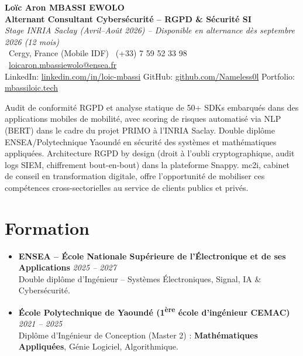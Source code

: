 \documentclass[a4paper,11pt]{article}
\begin{document}
\begin{center}
    {\Large \textbf{Lo\"ic Aron MBASSI EWOLO}} \\ \vspace{4pt}
    \textbf{\large Alternant Consultant Cybersécurité -- RGPD \& Sécurité SI} \\
    \textit{\small Stage INRIA Saclay (Avril--Ao\^ut 2026) -- Disponible en alternance d\`es septembre 2026 (12 mois)} \\ \vspace{4pt}
    \small
    \Pointinghand\ Cergy, France (Mobile IDF) \quad \Mobilefone\ (+33) 7 59 52 33 98 \quad
    {\color{primary}\Letter\ \href{mailto:loicaron.mbassiewolo@ensea.fr}{loicaron.mbassiewolo@ensea.fr}} \\ \vspace{2pt}
    {\color{primary}LinkedIn: \href{https://www.linkedin.com/in/loic-mbassi/}{linkedin.com/in/loic-mbassi}} \quad
    {\color{primary}GitHub: \href{https://github.com/Nameless0l}{github.com/Nameless0l}} \quad
    {\color{primary}Portfolio: \href{https://mbassiloic.tech}{mbassiloic.tech}}
\end{center}
\vspace{-6pt}
\noindent\small{Audit de conformité RGPD et analyse statique de 50+ SDKs embarqués dans des applications mobiles de mobilité, avec scoring de risques automatisé via NLP (BERT) dans le cadre du projet PRIMO à l'INRIA Saclay. Double diplôme ENSEA/Polytechnique Yaoundé en sécurité des systèmes et mathématiques appliquées. Architecture RGPD by design (droit à l'oubli cryptographique, audit logs SIEM, chiffrement bout-en-bout) dans la plateforme Snappy. mc2i, cabinet de conseil en transformation digitale, offre l'opportunité de mobiliser ces compétences cross-sectorielles au service de clients publics et privés.}

\section{Formation}
\begin{itemize}[leftmargin=*, label=\tiny$\bullet$, nosep]
    \item \textbf{ENSEA -- \'Ecole Nationale Sup\'erieure de l'\'Electronique et de ses Applications} \hfill \textit{2025 -- 2027} \\
    \small{Double dipl\^ome d'Ing\'enieur -- Syst\`emes \'Electroniques, Signal, IA \& Cybersécurité.}
    \item \textbf{\'Ecole Polytechnique de Yaound\'e (1\textsuperscript{\`ere} \'ecole d'ing\'enieur CEMAC)} \hfill \textit{2021 -- 2025} \\
    \small{Dipl\^ome d'Ing\'enieur de Conception (Master 2) : \textbf{Math\'ematiques Appliqu\'ees}, G\'enie Logiciel, Algorithmique.}
\end{itemize}
\end{document}
